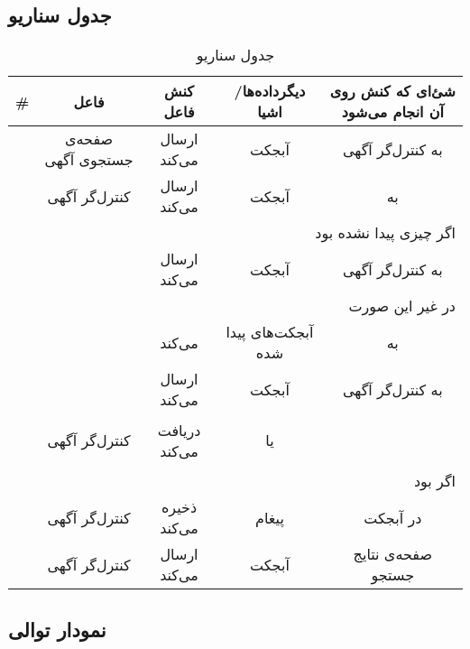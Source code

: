 \subsection{جدول سناریو}
\begin{table}[H]
	\caption{جدول سناریو }
	\begin{adjustbox}{width=\textwidth}
		\begin{tabular}{|c|c|c|c|c|}
			\hline								
			\# & فاعل & کنش فاعل & دیگرداده‌ها/اشیا & شئ‌ای که کنش روی آن انجام می‌شود \\
			\hline
			\hline
			\sstep &
			صفحه‌ی جستجو‌ی آگهی &
			ارسال می‌کند &
			آبجکت \json &
			به کنترل‌گر آگهی \\
			\hline
			\sstep &
			کنترل‌گر آگهی&
			ارسال می‌کند &
			آبجکت \json &
			به \gdm\\
			\hline
			\sstep &
			\multicolumn{4}{|r|}{اگر چیزی پیدا نشده بود}\\
			\hline
			\sstep &
			\gdm&
			ارسال می‌کند &
			آبجکت \none&
			به کنترل‌گر آگهی \\
			\hline
			\sstep &
			\multicolumn{4}{|r|}{در غیر این صورت}\\
			\hline
			\sstep &
			\gdm&
			\serialize می‌کند&
			آبجکت‌های پیدا شده &
			به \json \\
			\hline
			\sstep &
			\gdm &
			ارسال ‌می‌کند&
			آبجکت \json &
			به کنترل‌‌گر آگهی \\
			\hline
			\sstep &
			کنترل‌‌گر آگهی&
			دریافت می‌کند &
			\begin{inparaitem}
				\item \none 
			\end{inparaitem}
			یا 
			\begin{inparaitem}
				\item \json
			\end{inparaitem}
			&
			\\
			\hline
			\sstep &
			\multicolumn{4}{|r|}{اگر \none بود}
			\\
			\hline
			\sstep &
			کنترل‌گر آگهی &
			ذخیره می‌کند &
			پیغام \say{آگهی‌ای پیدا نشد}&
			در آبجکت \json \\
			\hline
			\sstep &
			کنترل‌گر آگهی &
			ارسال می‌کند &
			آبجکت \json &
            صفحه‌ی نتایج جستجو\\
			\hline
		\end{tabular}
	\end{adjustbox}
\end{table}
\setcounter{MainStepCounter}{0}
\setcounter{SenarioCounter}{0}
\subsection{نمودار توالی}

